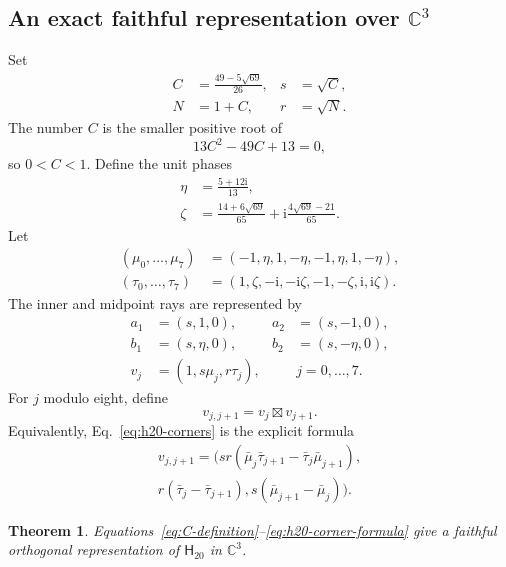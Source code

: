 \documentclass[twocolumn,aps,pra,floatfix,amsmath,amssymb,longbibliography]{revtex4-2}
\newtheorem{theorem}{Theorem}
\theoremstyle{definition}
\theoremstyle{remark}
\newcommand{\ii}{\mathrm{i}}
\newcommand{\C}{\mathbb C}
\newcommand{\Htwenty}{\mathsf H_{20}}
\begin{document}
\subsection{An exact faithful representation over
\texorpdfstring{$\C^3$}{C3}}

Set
\begin{equation}
 \begin{aligned}
 C&=\frac{49-5\sqrt{69}}{26},&s&=\sqrt C,\\
 N&=1+C,&r&=\sqrt N.
 \end{aligned}
 \label{eq:C-definition}
\end{equation}
The number $C$ is the smaller positive root of
\begin{equation}
 13C^2-49C+13=0,
 \label{eq:C-polynomial}
\end{equation}
so $0<C<1$.  Define the unit phases
\begin{align}
 \eta&=\frac{5+12\ii}{13},\label{eq:eta}\\
 \zeta&=\frac{14+6\sqrt{69}}{65}
 +\ii\frac{4\sqrt{69}-21}{65}.
 \label{eq:zeta}
\end{align}
Let
\begin{align*}
 (\mu_0,\ldots,\mu_7)&=(-1,\eta,1,-\eta,-1,\eta,1,-\eta),\\
 (\tau_0,\ldots,\tau_7)&=(1,\zeta,-\ii,-\ii\zeta,
 -1,-\zeta,\ii,\ii\zeta).
\end{align*}
The inner and midpoint rays are represented by
\begin{align}
 a_1&=(s,1,0),&a_2&=(s,-1,0),\nonumber\\
 b_1&=(s,\eta,0),&b_2&=(s,-\eta,0),
 \label{eq:h20-inner-vectors}\\
 v_j&=(1,s\mu_j,r\tau_j),&&j=0,\ldots,7.
 \label{eq:h20-midpoints}
\end{align}
For $j$ modulo eight, define
\begin{equation}
 v_{j,j+1}=v_j\boxtimes v_{j+1}.
 \label{eq:h20-corners}
\end{equation}
Equivalently, Eq.~\eqref{eq:h20-corners} is the explicit formula
\begin{multline}
 v_{j,j+1}=\bigl(
 sr(\bar\mu_j\bar\tau_{j+1}-\bar\tau_j\bar\mu_{j+1}),\\
 r(\bar\tau_j-\bar\tau_{j+1}),
 s(\bar\mu_{j+1}-\bar\mu_j)\bigr).
 \label{eq:h20-corner-formula}
\end{multline}

\begin{theorem}
\label{thm:h20-complex}
Equations~\eqref{eq:C-definition}--\eqref{eq:h20-corner-formula}
give a faithful orthogonal representation of $\Htwenty$ in $\C^3$.
\end{theorem}
\end{document}
